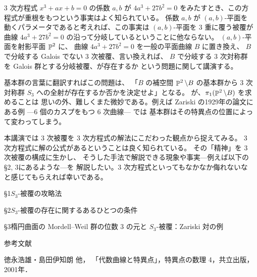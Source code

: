 \documentclass[uplatex,dvipdfmx]{jlreq}
\newcommand{\PP}{\mathop {\Bbb P}\nolimits}
\begin{document}
\bigskip

$3$ 次方程式
$x^3 + ax + b = 0$ の係数
$a, b$ が $4a^3 + 27b^2 = 0$
をみたすとき、この方程式が重根をもつという事実はよく知られている。
係数 $a, b$ が $(a, b)$-平面を動くパラメータであると考えれば、この事実は $(a,b)$-平面を $3$ 重に覆う被覆が
曲線 $4a^3 + 27b^2 = 0$ の沿って分岐しているということに他ならない。
$(a, b)$-平面を射影平面 $\PP^2$ に、
曲線 $4a^3 + 27 b^2 = 0$ を一般の平面曲線 $B$ に置き換え、
$B$ で分岐する Galois でない $3$ 次被覆、言い換えれば、
$B$ で分岐する $3$ 次対称群を Galois 群とする分岐被覆、が存在するか
という問題に関して講演する。

\medskip

基本群の言葉に翻訳すればこの問題は、
「$B$ の補空間 $\PP^2\setminus B$ の基本群から $3$ 次対称群
$S_3$ への全射が存在するか否かを決定せよ」となる。
が、$\pi_1(\PP^2\setminus B)$ を求めることは
思いの外、難しくまた微妙である。例えば Zariski の1929年の論文にある例
---$6$ 個のカスプをもつ $6$ 次曲線--- では
基本群はその特異点の位置によって変わってしまう。

\medskip

本講演では $3$ 次被覆を $3$ 次方程式の解法にこだわった観点から捉えてみる。
$3$ 次方程式に解の公式があるということは良く知られている。
その「精神」を $3$ 次被覆の構成に生かし、
そうした手法で解説できる現象や事実---例えば以下の\S2, 3にあるような---を
解説したい。$3$ 次方程式といってもなかなか侮れないなと感じてもらえれば幸いである。

\medskip

\S1\quad $S_3$-被覆の攻略法

\medskip

\S2\quad $S_3$-被覆の存在に関するあるひとつの条件

\medskip

\S3\quad 楕円曲面の Mordell--Weil 群の位数 $3$ の元と $S_3$-被覆：Zariski 対の例

\begin{center}\textsc{参考文献}\end{center}

\begin{enumerate}[{[1]}]
  \setlength{\itemsep}{2pt}
  \item[{[1]}] 徳永浩雄・島田伊知朗 他，
        「代数曲線と特異点」，特異点の数理 4，共立出版，2001年．
\end{enumerate}
\end{document}
